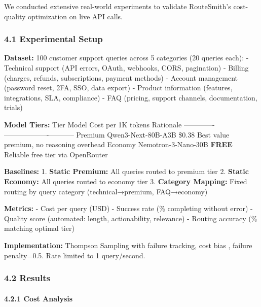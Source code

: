 \documentclass[
]{article}
\begin{document}
We conducted extensive real-world experiments to validate RouteSmith's
cost-quality optimization on live API calls.

\hypertarget{experimental-setup-1}{%
\subsubsection{4.1 Experimental Setup}\label{experimental-setup-1}}

\textbf{Dataset:} 100 customer support queries across 5 categories (20
queries each): - Technical support (API errors, OAuth, webhooks, CORS,
pagination) - Billing (charges, refunds, subscriptions, payment methods)
- Account management (password reset, 2FA, SSO, data export) - Product
information (features, integrations, SLA, compliance) - FAQ (pricing,
support channels, documentation, trials)

\textbf{Model Tiers:} \textbar{} Tier \textbar{} Model \textbar{} Cost
per 1K tokens \textbar{} Rationale \textbar{}
\textbar------\textbar-------\textbar-------------------\textbar-----------\textbar{}
\textbar{} Premium \textbar{} Qwen3-Next-80B-A3B \textbar{} \$0.38
\textbar{} Best value premium, no reasoning overhead \textbar{}
\textbar{} Economy \textbar{} Nemotron-3-Nano-30B \textbar{}
\textbf{FREE} \textbar{} Reliable free tier via OpenRouter \textbar{}

\textbf{Baselines:} 1. \textbf{Static Premium:} All queries routed to
premium tier 2. \textbf{Static Economy:} All queries routed to economy
tier 3. \textbf{Category Mapping:} Fixed routing by query category
(technical→premium, FAQ→economy)

\textbf{Metrics:} - Cost per query (USD) - Success rate (\% completing
without error) - Quality score (automated: length, actionability,
relevance) - Routing accuracy (\% matching optimal tier)

\textbf{Implementation:} Thompson Sampling with failure tracking, cost
bias , failure penalty=0.5. Rate limited to 1 query/second.

\hypertarget{results-1}{%
\subsubsection{4.2 Results}\label{results-1}}

\hypertarget{cost-analysis-1}{%
\paragraph{4.2.1 Cost Analysis}\label{cost-analysis-1}}
\end{document}
